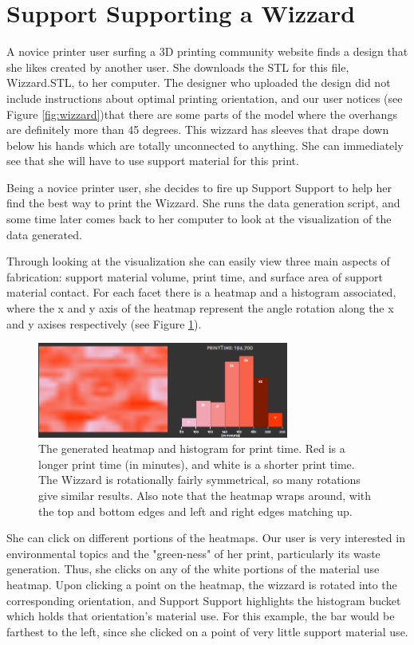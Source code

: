 \documentclass{sigchi}
\begin{document}
\section{Support Supporting a Wizzard}
A novice printer user surfing a 3D printing community website finds a design that she likes created by another user.  She downloads the STL for this file, Wizzard.STL, to her computer.  The designer who uploaded the design did not include instructions about optimal printing orientation, and our user notices (see Figure \ref{fig:wizzard})that there are some parts of the model where the overhangs are definitely more than 45 degrees.  This wizzard has sleeves that drape down below his hands which are totally unconnected to anything.  She can immediately see that she will have to use support material for this print.

Being a novice printer user, she decides to fire up Support Support to help her find the best way to print the Wizzard.  She runs the data generation script, and some time later comes back to her computer to look at the visualization of the data generated.

Through looking at the visualization she can easily view three main aspects of fabrication: support material volume, print time, and surface area of support material contact. For each facet there is a heatmap and a histogram associated, where the x and y axis of the heatmap represent the angle rotation along the x and y axises respectively (see Figure \ref{fig:heatmap}).

\begin{figure}
\centering
\includegraphics[width=3.25in]{images/heatmap.png}
\caption{The generated heatmap and histogram for print time.  Red is a longer print time (in minutes), and white is a shorter print time.  The Wizzard is rotationally fairly symmetrical, so many rotations give similar results.  Also note that the heatmap wraps around, with the top and bottom edges and left and right edges matching up.}
\label{fig:heatmap}
\end{figure}

She can click on different portions of the heatmaps.  Our user is very interested in environmental topics and the "green-ness" of her print, particularly its waste generation. Thus, she clicks on any of the white portions of the material use heatmap. Upon clicking a point on the heatmap, the wizzard is rotated into the corresponding orientation, and Support Support highlights the histogram bucket which holds that orientation's material use. For this example, the bar would be farthest to the left, since she clicked on a point of very little support material use.
\end{document}
